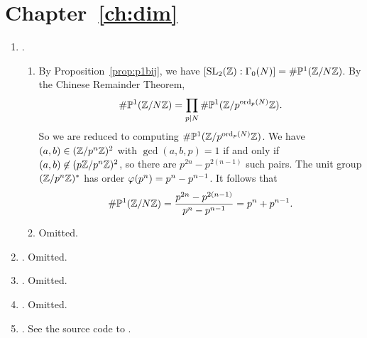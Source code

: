 \section{Chapter~\ref{ch:dim}}
\begin{enumerate}
\item {}.
\begin{enumerate}
\item By Proposition~\ref{prop:p1bij}, we have 
$[\operatorname{SL}_2(\mathbb{Z}):\Gamma_0(N)] = \#{\mathbb P}^1(\mathbb{Z}/N\mathbb{Z})$.  
By the Chinese Remainder Theorem, 
$$\#{\mathbb P}^1(\mathbb{Z}/N\mathbb{Z}) = \prod_{p\mid N} \#{\mathbb P}^1(\mathbb{Z}/p^{\operatorname{ord}_p(N)}\mathbb{Z}).$$
So we are reduced to computing $\#{\mathbb P}^1(\mathbb{Z}/p^{\operatorname{ord}_p(N)}\mathbb{Z})$.
We have $(a,b)\in (\mathbb{Z}/p^n\mathbb{Z})^2$ with $\gcd(a,b,p)=1$
if and only if $(a,b)\not\in (p\mathbb{Z}/p^n\mathbb{Z})^2$, so
there are $p^{2n} - p^{2(n-1)}$ such pairs. 
The unit group $(\mathbb{Z}/p^n\mathbb{Z})^*$ has order $\varphi(p^n) = p^n - p^{n-1}$.
It follows that 
$$
  \#{\mathbb P}^1(\mathbb{Z}/N\mathbb{Z}) = \frac{p^{2n} - p^{2(n-1)}}{p^n - p^{n-1}}
   = p^{n} + p^{n-1}.
$$
\item Omitted.
\end{enumerate}

\item {}.  Omitted.

\item {}. Omitted.

\item {}. Omitted.

\item {}. See the source
code to \sage.  

\end{enumerate}


